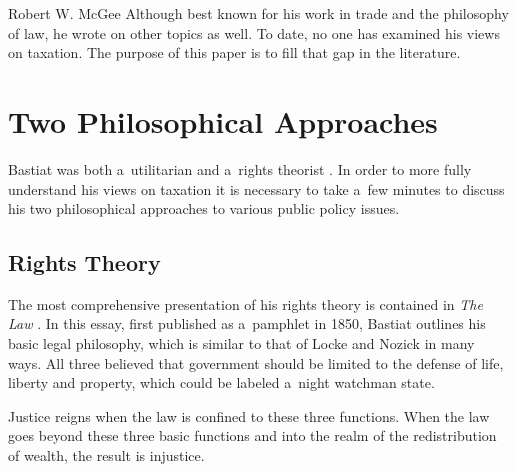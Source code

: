 \begin{artengenv}{Robert W. McGee}
Although best known for his work in trade and the philosophy of law, he wrote on other topics as well. To date, no one has examined his views on taxation. The purpose of this paper is to fill that gap in the literature.



\section{Two Philosophical Approaches}

Bastiat was both a~utilitarian 
\parencites[][]{bastiat_ce_1850}[][]{bastiat_libre-echange_1862}[][]{bastiat_cobden_1864}[][]{bastiat_harmonies_1870}[][]{bastiat_ce_1873}[][]{bastiat_sophismes_1873}[][]{bastiat_economic_1964}[][]{bastiat_economic_1964-1}[][]{bastiat_selected_1964}[][]{bastiat_bastiat_2007}[][]{bastiat_collected_2010} %
 and a~rights theorist 
\parencites[][pp.342–393]{bastiat_ce_1873}[][]{bastiat_law_1998}[][I:~49-94]{bastiat_bastiat_2007}. %
 In order to more fully understand his views on taxation it is necessary to take a~few minutes to discuss his two philosophical approaches to various public policy issues.



\subsection{Rights Theory }



The most comprehensive presentation of his rights theory is contained in \textit{The Law} 
\parencites[][pp.342–393]{bastiat_ce_1873}[][]{bastiat_law_1998}[][I:~49-94]{bastiat_bastiat_2007}. %
 In this essay, first published as a~pamphlet in 1850, Bastiat outlines his basic legal philosophy, which is similar to that of Locke 
\parencite*[][]{locke_two_1689} %
 and Nozick 
\parencite*[][]{nozick_anarchy_1974} %
 in many ways. All three believed that government should be limited to the defense of life, liberty and property, which could be labeled a~night watchman state.



Justice reigns when the law is confined to these three functions. When the law goes beyond these three basic functions and into the realm of the redistribution of wealth, the result is injustice.




\end{artengenv}
